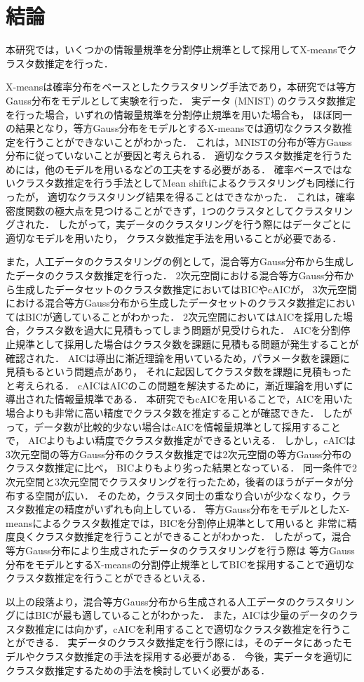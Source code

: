 \section{結論}

本研究では，いくつかの情報量規準を分割停止規準として採用してX-meansでクラスタ数推定を行った．

X-meansは確率分布をベースとしたクラスタリング手法であり，本研究では等方Gauss分布をモデルとして実験を行った．
実データ (MNIST) のクラスタ数推定を行った場合，いずれの情報量規準を分割停止規準を用いた場合も，
ほぼ同一の結果となり，等方Gauss分布をモデルとするX-meansでは適切なクラスタ数推定を行うことができないことがわかった．
これは，MNISTの分布が等方Gauss分布に従っていないことが要因と考えられる．
適切なクラスタ数推定を行うためには，他のモデルを用いるなどの工夫をする必要がある．
確率ベースではないクラスタ数推定を行う手法としてMean shiftによるクラスタリングも同様に行ったが，
適切なクラスタリング結果を得ることはできなかった．
これは，確率密度関数の極大点を見つけることができず，1つのクラスタとしてクラスタリングされた．
したがって，実データのクラスタリングを行う際にはデータごとに適切なモデルを用いたり，
クラスタ数推定手法を用いることが必要である．

また，人工データのクラスタリングの例として，混合等方Gauss分布から生成したデータのクラスタ数推定を行った．
2次元空間における混合等方Gauss分布から生成したデータセットのクラスタ数推定においてはBICやcAICが，
3次元空間における混合等方Gauss分布から生成したデータセットのクラスタ数推定においてはBICが適していることがわかった．
2次元空間においてはAICを採用した場合，クラスタ数を過大に見積もってしまう問題が見受けられた．
AICを分割停止規準として採用した場合はクラスタ数を課題に見積もる問題が発生することが確認された．
AICは導出に漸近理論を用いているため，パラメータ数を課題に見積もるという問題点があり，
それに起因してクラスタ数を課題に見積もったと考えられる．
cAICはAICのこの問題を解決するために，漸近理論を用いずに導出された情報量規準である．
本研究でもcAICを用いることで，AICを用いた場合よりも非常に高い精度でクラスタ数を推定することが確認できた．
したがって，データ数が比較的少ない場合はcAICを情報量規準として採用することで，
AICよりもよい精度でクラスタ数推定ができるといえる．
しかし，cAICは3次元空間の等方Gauss分布のクラスタ数推定では2次元空間の等方Gauss分布のクラスタ数推定に比べ，
BICよりもより劣った結果となっている．
同一条件で2次元空間と3次元空間でクラスタリングを行ったため，後者のほうがデータが分布する空間が広い．
そのため，クラスタ同士の重なり合いが少なくなり，クラスタ数推定の精度がいずれも向上している．
等方Gauss分布をモデルとしたX-meansによるクラスタ数推定では，BICを分割停止規準として用いると
非常に精度良くクラスタ数推定を行うことができることがわかった．
したがって，混合等方Gauss分布により生成されたデータのクラスタリングを行う際は
等方Gauss分布をモデルとするX-meansの分割停止規準としてBICを採用することで適切なクラスタ数推定を行うことができるといえる．

以上の段落より，混合等方Gauss分布から生成される人工データのクラスタリングにはBICが最も適していることがわかった．
また，AICは少量のデータのクラスタ数推定には向かず，cAICを利用することで適切なクラスタ数推定を行うことができる．
実データのクラスタ数推定を行う際には，そのデータにあったモデルやクラスタ数推定の手法を採用する必要がある．
今後，実データを適切にクラスタ数推定するための手法を検討していく必要がある．
